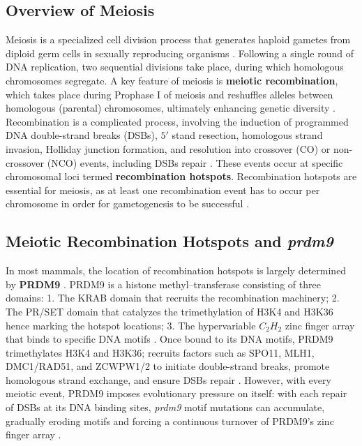 \documentclass[12pt,a4paper]{article}
\begin{document}
\subsection{Overview of Meiosis}
Meiosis is a specialized cell division process that generates haploid gametes from diploid germ cells in sexually reproducing organisms \parencite{handel_genetics_2010}. Following a single round of DNA replication, two sequential divisions take place, during which homologous chromosomes segregate. A key feature of meiosis is \textbf{meiotic recombination}, which takes place during Prophase I of meiosis and reshuffles alleles between homologous (parental) chromosomes, ultimately enhancing genetic diversity \parencite{hunter_meiotic_2015, baudat_meiotic_2013}. Recombination is a complicated process, involving the induction of programmed DNA double-strand breaks (DSBs), $5'$ stand resection, homologous strand invasion, Holliday junction formation, and resolution into crossover (CO) or non-crossover (NCO) events, including DSBs repair \parencite{lange_landscape_2016, borner_crossovernoncrossover_2004}. These events occur at specific chromosomal loci termed \textbf{recombination hotspots}. Recombination hotspots are essential for meiosis, as at least one recombination event has to occur per chromosome in order for gametogenesis to be successful \parencite{lange_landscape_2016}.

\subsection{Meiotic Recombination Hotspots and \textit{prdm9}}
In most mammals, the location of recombination hotspots is largely determined by \textbf{PRDM9} \parencite{powers_meiotic_2016, imai_prdm9_2017, cavassim_prdm9_2022, abualia_natural_2024}. PRDM9 is a histone methyl--transferase consisting of three domains: 1. The KRAB domain that recruits the recombination machinery; 2. The PR/SET domain that catalyzes the trimethylation of H3K4 and H3K36 hence marking the hotspot locations; 3. The hypervariable $C_2H_2$ zinc finger array that binds to specific DNA motifs \parencite{powers_meiotic_2016, imai_prdm9_2017, cavassim_prdm9_2022}. Once bound to its DNA motifs, PRDM9 trimethylates H3K4 and H3K36; recruits factors such as SPO11, MLH1, DMC1/RAD51, and ZCWPW1/2 to initiate double-strand breaks, promote homologous strand exchange, and ensure DSBs repair \parencite{parvanov_prdm9_2017, tian_ewsr1_2021}. However, with every meiotic event, PRDM9 imposes evolutionary pressure on itself: with each repair of DSBs at its DNA binding sites, \textit{prdm9} motif mutations can accumulate, gradually eroding motifs and forcing a continuous turnover of PRDM9's zinc finger array \parencite{baker_prdm9_2015}.
\end{document}
